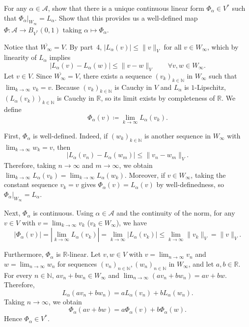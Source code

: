 \documentclass[10pt]{mypackage}
\renewcommand{\coloneq}{\coloneqq}
\begin{document}
\begin{problem}[Problem I.5]
  For any $\alpha\in \mathcal{A}$, show that there is a unique continuous linear form $\Phi_{\alpha}\in V^{\ast}$ such that $\Phi_{\alpha}|_{W_{\infty}} = L_{\alpha}$. Show that this provides us a well-defined map $\Phi\colon \mathcal{A}\to B_{V^{\ast}}\left( 0,1 \right)$ taking $\alpha\mapsto \Phi_{\alpha}$.
\end{problem}
\begin{solution}
  Notice that $\overline{W_{\infty}} = V$. By part~4, $|L_{\alpha}(v)| \le \|v\|_{V}$ for all $v \in W_{\infty}$, which by linearity of $L_{\alpha}$ implies
\[
|L_{\alpha}(v) - L_{\alpha}(w)| \le \|v - w\|_{V} \qquad \forall v, w \in W_{\infty}.
\]
Let $v \in V$. Since $\overline{W_{\infty}} = V$, there exists a sequence $(v_{k})_{k \in \mathbb{N}}$ in $W_{\infty}$ such that $\lim_{k \to \infty} v_{k} = v$. Because $(v_{k})_{k \in \mathbb{N}}$ is Cauchy in $V$ and $L_{\alpha}$ is $1$-Lipschitz, $(L_{\alpha}(v_{k}))_{k \in \mathbb{N}}$ is Cauchy in $\mathbb{R}$, so its limit exists by completeness of $\mathbb{R}$. We define
\[
\Phi_{\alpha}(v) \coloneq \lim_{k \to \infty} L_{\alpha}(v_{k}).
\]

First, $\Phi_{\alpha}$ is well-defined. Indeed, if $(w_{k})_{k \in \mathbb{N}}$ is another sequence in $W_{\infty}$ with $\lim_{k \to \infty} w_{k} = v$, then
\[
|L_{\alpha}(v_{n}) - L_{\alpha}(w_{m})| \le \|v_{n} - w_{m}\|_{V}.
\]
Therefore, taking $n \to \infty$ and $m \to \infty$, we obtain $\lim_{k \to \infty} L_{\alpha}(v_{k}) = \lim_{k \to \infty} L_{\alpha}(w_{k})$. Moreover, if $v \in W_{\infty}$, taking the constant sequence $v_{k} = v$ gives $\Phi_{\alpha}(v) = L_{\alpha}(v)$ by well-definedness, so $\Phi_{\alpha}|_{W_{\infty}} = L_{\alpha}$.

Next, $\Phi_{\alpha}$ is continuous. Using $\alpha \in \mathcal{A}$ and the continuity of the norm, for any $v \in V$ with $v = \lim_{k \to \infty} v_{k}$ ($v_{k} \in W_{\infty}$), we have
\[
|\Phi_{\alpha}(v)| = \left|\lim_{k \to \infty} L_{\alpha}(v_{k})\right| = \lim_{k \to \infty} |L_{\alpha}(v_{k})| \le \lim_{k \to \infty} \|v_{k}\|_{V} = \|v\|_{V}.
\]

Furthermore, $\Phi_{\alpha}$ is $\mathbb{R}$-linear. Let $v, w \in V$ with $v = \lim_{n \to \infty} v_{n}$ and $w = \lim_{n \to \infty} w_{n}$ for sequences $(v_{n})_{n \in \mathbb{N}}, (w_{n})_{n \in \mathbb{N}}$ in $W_{\infty}$, and let $a, b \in \mathbb{R}$. For every $n \in \mathbb{N}$, $a v_{n} + b w_{n} \in W_{\infty}$ and $\lim_{n \to \infty} (a v_{n} + b w_{n}) = a v + b w$. Therefore,
\[
L_{\alpha}(a v_{n} + b w_{n}) = a L_{\alpha}(v_{n}) + b L_{\alpha}(w_{n}).
\]
Taking $n \to \infty$, we obtain
\[
\Phi_{\alpha}(a v + b w) = a \Phi_{\alpha}(v) + b \Phi_{\alpha}(w).
\]
Hence $\Phi_{\alpha} \in V^{\ast}$.


\end{solution}
\end{document}
